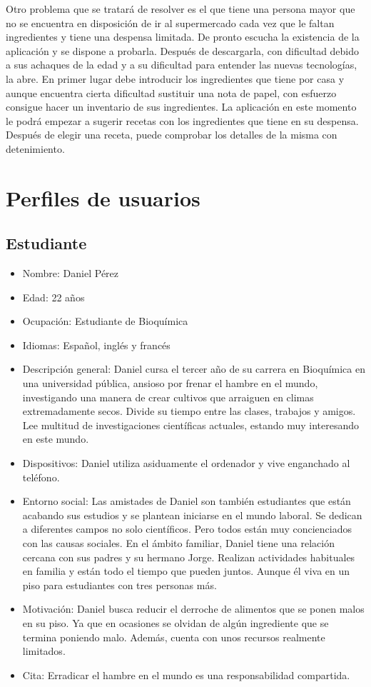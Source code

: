 Otro problema que se tratará de resolver es el que tiene una persona mayor que no se encuentra en disposición de ir al supermercado cada vez que le faltan ingredientes y tiene una despensa limitada. De pronto escucha la existencia de la aplicación y se dispone a probarla. Después de descargarla, con dificultad debido a sus achaques de la edad y a su dificultad para entender las nuevas tecnologías, la abre. En primer lugar debe introducir los ingredientes que tiene por casa y aunque encuentra cierta dificultad sustituir una nota de papel, con esfuerzo consigue hacer un inventario de sus ingredientes. La aplicación en este momento le podrá empezar a sugerir recetas con los ingredientes que tiene en su despensa. Después de elegir una receta, puede comprobar los detalles de la misma con detenimiento.

\section{Perfiles de usuarios}
\subsection{Estudiante}
\begin{itemize}
    \item Nombre: Daniel Pérez
    \item Edad: 22 años
    \item Ocupación: Estudiante de Bioquímica
    \item Idiomas: Español, inglés y francés
    \item Descripción general: Daniel cursa el tercer año de su carrera en Bioquímica en una universidad pública, ansioso por frenar el hambre en el mundo, investigando una manera de crear cultivos que arraiguen en climas extremadamente secos. Divide su tiempo entre las clases, trabajos y amigos. Lee multitud de investigaciones científicas actuales, estando muy interesando en este mundo.
    \item Dispositivos: Daniel utiliza asiduamente el ordenador y vive enganchado al teléfono.
    \item Entorno social: Las amistades de Daniel son también estudiantes que están acabando sus estudios y se plantean iniciarse en el mundo laboral. Se dedican a diferentes campos no solo científicos. Pero todos están muy concienciados con las causas sociales. En el ámbito familiar, Daniel tiene una relación cercana con sus padres y su hermano Jorge. Realizan actividades habituales en familia y están todo el tiempo que pueden juntos. Aunque él viva en un piso para estudiantes con tres personas más.
    \item Motivación: Daniel busca reducir el derroche de alimentos que se ponen malos en su piso. Ya que en ocasiones se olvidan de algún ingrediente que se termina poniendo malo. Además, cuenta con unos recursos realmente limitados. 
    \item Cita: Erradicar el hambre en el mundo es una responsabilidad compartida.
\end{itemize}

